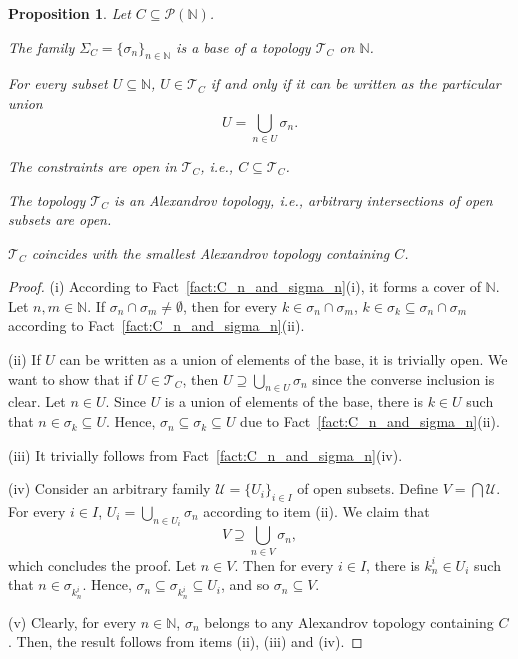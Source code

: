 \documentclass[8pt,a4paper,oneside,english,english]{article}
\theoremstyle{plain}
\theoremstyle
{plain}
\newtheorem{proposition}[theorem]{Proposition}%
\theoremstyle{definition}
\newcommand{\N}{\mathbb{N}}
\newcommand{\Tau}{\mathcal T}
\begin{document}
\begin{proposition}\label{prop:T_C}
    Let $C\subseteq\mathcal P(\N)$. 
    \begin{compactenum}[(i)]
        \item The family $\Sigma_C=\{\sigma_n\}_{n\in\N}$ is a base of a topology $\Tau_C$ on $\N$.
        \item For every subset $U\subseteq\N$, $U\in\Tau_C$ if and only if it can be written as the particular union
        \[
            U=\bigcup_{n\in U}\sigma_n.
        \]
        \item The constraints are open in $\Tau_C$, i.e., $C\subseteq\Tau_C$.
        \item The topology $\Tau_C$ is an {\em Alexandrov topology}, i.e., arbitrary intersections of open subsets are open.
        \item $\Tau_C$ coincides with the smallest Alexandrov topology containing $C$.
    \end{compactenum}
\end{proposition}
\begin{proof}
    (i) According to Fact~\ref{fact:C_n_and_sigma_n}(i), it forms a cover of $\N$. Let $n,m\in\N$. If $\sigma_n\cap\sigma_m\neq\emptyset$, then for every $k\in\sigma_n\cap\sigma_m$, $k\in\sigma_k\subseteq\sigma_n\cap\sigma_m$ according to Fact~\ref{fact:C_n_and_sigma_n}(ii).

    (ii) If $U$ can be written as a union of elements of the base, it is trivially open. We want to show that if $U\in\Tau_C$, then $U\supseteq\bigcup_{n\in U}\sigma_n$ since the converse inclusion is clear.
    Let $n\in U$. Since $U$ is a union of elements of the base, there is $k\in U$ such that $n\in\sigma_k\subseteq U$. Hence, $\sigma_n\subseteq\sigma_k\subseteq U$ due to Fact~\ref{fact:C_n_and_sigma_n}(ii). 
    

    (iii) It trivially follows from
    Fact~\ref{fact:C_n_and_sigma_n}(iv).

    (iv) Consider an arbitrary family $\mathcal{U}=\{U_i\}_{i\in I}$ of open subsets. Define $V=\bigcap\mathcal{U}$. For every $i\in I$, $U_i=\bigcup_{n\in U_i}\sigma_n$ according to item (ii). We claim that 
    \[
      V\supseteq\bigcup_{n\in V}\sigma_n,
    \]
    which concludes the proof. 
    Let $n\in V$. Then for every $i\in I$, there is $k_n^i\in U_i$ such that $n\in\sigma_{k_{n}^{i}}$. Hence, $\sigma_n\subseteq\sigma_{k_{n}^{i}}\subseteq U_i$, and so $\sigma_n\subseteq V$.
    

    (v) Clearly, for every $n\in\N$, $\sigma_n$ belongs to any Alexandrov topology containing $C$. Then, the result follows from items (ii), (iii) and (iv).
    
\end{proof}
\end{document}
